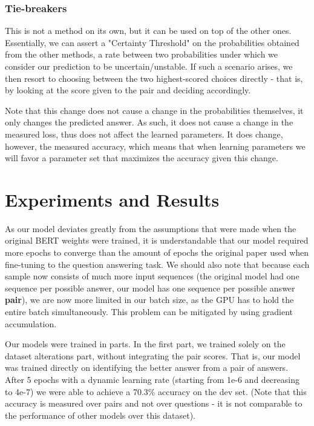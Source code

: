 \documentclass{article}
\begin{document}
\subsubsection{Tie-breakers}

This is not a method on its own, but it can be used on top of the other ones.
Essentially, we can assert a "Certainty Threshold" on the probabilities obtained from the other methods, a rate between two probabilities under which we consider our prediction to be uncertain/unstable.
If such a scenario arises, we then resort to choosing between the two highest-scored choices directly - that is, by looking at the score given to the pair and deciding accordingly.

Note that this change does not cause a change in the probabilities themselves, it only changes the predicted answer. As such, it does not cause a change in the measured loss, thus does not affect the learned parameters. It does change, however, the measured accuracy, which means that when learning parameters we will favor a parameter set that maximizes the accuracy given this change.

\section{Experiments and Results} 

As our model deviates greatly from the assumptions that were made when the original BERT weights were trained, it is understandable that our model required more epochs to converge than the amount of epochs the original paper used when fine-tuning to the question answering task.
We should also note that because each sample now consists of much more input sequences (the original model had one sequence per possible answer, our model has one sequence per possible answer \textbf{pair}), we are now more limited in our batch size, as the GPU has to hold the entire batch simultaneously. This problem can be mitigated by using gradient accumulation.

Our models were trained in parts.
In the first part, we trained solely on the dataset alterations part, without integrating the pair scores. That is, our model was trained directly on identifying the better answer from a pair of answers. After 5 epochs with a dynamic learning rate (starting from 1e-6 and decreasing to 4e-7) we were able to achieve a 70.3\% accuracy on the dev set. (Note that this accuracy is measured over pairs and not over questions - it is not comparable to the performance of other models over this dataset).
\end{document}
